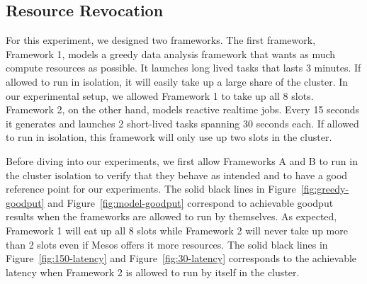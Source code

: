 \subsection{Resource Revocation}
For this experiment, we designed two frameworks. The first framework, Framework 1, models a greedy
data analysis framework that wants as much compute resources as possible. It launches long lived tasks
that lasts 3 minutes. If allowed to run in isolation, it will easily take up a large share of the 
cluster. In our experimental setup, we allowed Framework 1 to take up all 8 slots. Framework 2, on the
other hand, models reactive realtime jobs. Every 15 seconds it generates and launches 2 short-lived 
tasks spanning 30 seconds each. If allowed to run in isolation, this framework will only use up two 
slots in the cluster. 

Before diving into our experiments, we first allow Frameworks A and B to run in the cluster isolation to
verify that they behave as intended and to have a good reference point for our experiments. The solid
black lines in Figure~\ref{fig:greedy-goodput} and Figure~\ref{fig:model-goodput} correspond to 
achievable goodput results when the frameworks are allowed to run by themselves. As expected, 
Framework 1 will eat up all 8 slots while Framework 2 will never take up more than 2 slots even if 
Mesos offers it more resources. The solid black lines in Figure~\ref{fig:150-latency} and
Figure~\ref{fig:30-latency} corresponds to the achievable latency when Framework 2 is allowed to run by
itself in the cluster.

